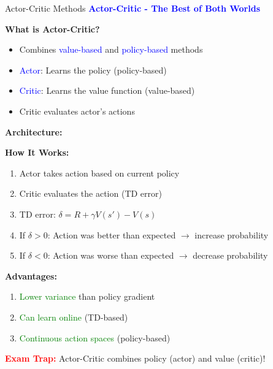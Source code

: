 \documentclass[8pt]{beamer}
\begin{document}
\begin{frame}{Actor-Critic Methods}
\fontsize{6.5}{7.5}\selectfont
\textcolor{blue}{\textbf{Actor-Critic - The Best of Both Worlds}}

\textbf{What is Actor-Critic?}
\begin{itemize}
\item Combines \textcolor{blue}{value-based} and \textcolor{blue}{policy-based} methods
\item \textcolor{blue}{Actor}: Learns the policy (policy-based)
\item \textcolor{blue}{Critic}: Learns the value function (value-based)
\item Critic evaluates actor's actions
\end{itemize}

\textbf{Architecture:}
\begin{center}
\end{center}

\textbf{How It Works:}
\begin{enumerate}
\item Actor takes action based on current policy
\item Critic evaluates the action (TD error)
\item TD error: $\delta = R + \gamma V(s') - V(s)$
\item If $\delta > 0$: Action was better than expected $\rightarrow$ increase probability
\item If $\delta < 0$: Action was worse than expected $\rightarrow$ decrease probability
\end{enumerate}

\textbf{Advantages:}
\begin{enumerate}
\item \textcolor{green}{Lower variance} than policy gradient
\item \textcolor{green}{Can learn online} (TD-based)
\item \textcolor{green}{Continuous action spaces} (policy-based)
\end{enumerate}

\textcolor{red}{\textbf{Exam Trap:}} Actor-Critic combines policy (actor) and value (critic)!
\end{frame}
\end{document}
